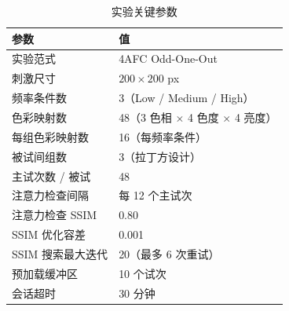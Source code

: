 \documentclass{article}
\begin{document}
\begin{table}[H]
\centering
\begin{tabular}{ll}
\toprule
参数 & 值 \\
\midrule
实验范式            & 4AFC Odd-One-Out \\
刺激尺寸            & $200 \times 200$ px \\
频率条件数          & 3（Low / Medium / High）\\
色彩映射数          & 48（3 色相 $\times$ 4 色度 $\times$ 4 亮度）\\
每组色彩映射数      & 16（每频率条件）\\
被试间组数          & 3（拉丁方设计）\\
主试次数 / 被试     & 48 \\
注意力检查间隔      & 每 12 个主试次 \\
注意力检查 SSIM     & 0.80 \\
SSIM 优化容差       & 0.001 \\
SSIM 搜索最大迭代   & 20（最多 6 次重试）\\
预加载缓冲区        & 10 个试次 \\
会话超时            & 30 分钟 \\
\bottomrule
\end{tabular}
\caption{实验关键参数}
\end{table}
\end{document}
